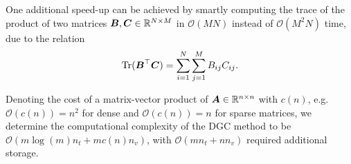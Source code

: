 One additional speed-up can be achieved by smartly computing the trace of the 
product of two matrices $\boldsymbol{B}, \boldsymbol{C} \in \mathbb{R}^{N \times M}$ in
$\mathcal{O}(MN)$ instead of $\mathcal{O}(M^2N)$ time, due to the relation
\begin{equation}
    \operatorname{Tr}(\boldsymbol{B}^{\top}\boldsymbol{C}) = \sum_{i=1}^{N} \sum_{j=1}^{M} B_{ij} C_{ij}.
    \label{equ:2-chebyshev-fast-trace}
\end{equation}

Denoting the cost of a matrix-vector product of $\boldsymbol{A} \in \mathbb{R}^{n \times n}$
with $c(n)$, e.g. $\mathcal{O}(c(n)) = n^2$ for dense and
$\mathcal{O}(c(n)) = n$ for sparse matrices, we determine the computational
complexity of the \gls{DGC} method to be $\mathcal{O}(m \log(m) n_t + m c(n) n_v)$,
with $\mathcal{O}(m n_t + n n_v)$ required additional storage.
